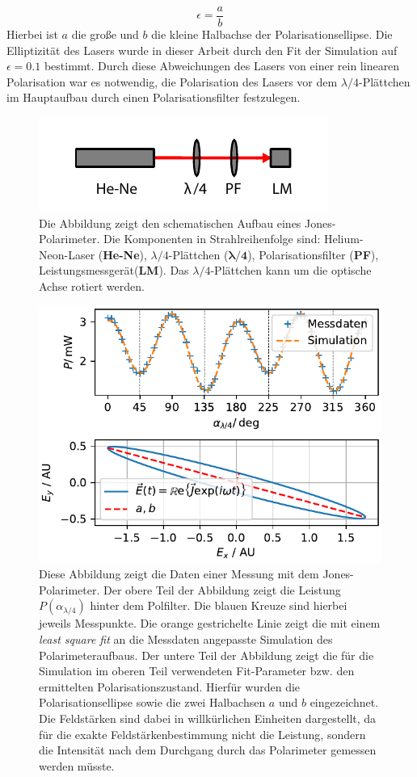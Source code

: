 \documentclass[titlepage,  ngerman]{article}
\begin{document}
	\begin{equation}
		\epsilon = \dfrac{a}{b}
	\end{equation}
	Hierbei ist $a$ die große und $b$ die kleine Halbachse der Polarisationsellipse. Die Elliptizität des Lasers wurde in dieser Arbeit durch den Fit der Simulation auf $\epsilon = 0.1 $ bestimmt. Durch diese Abweichungen des Lasers von einer rein linearen Polarisation war es notwendig, die Polarisation des Lasers vor dem $\lambda /4$-Plättchen im Hauptaufbau durch einen Polarisationsfilter festzulegen.
	\begin{figure}[h]
		\centering
		\includegraphics[width=0.5\linewidth]{figures/Polarimeter}
		\caption[Jones-Polarimeter]{Die Abbildung zeigt den schematischen Aufbau eines Jones-Polarimeter. Die Komponenten in Strahlreihenfolge sind: Helium-Neon-Laser (\textbf{He-Ne}), $\lambda/4$-Plättchen ($\boldsymbol{\lambda / 4}$), Polarisationsfilter (\textbf{PF}), Leistungsmessgerät(\textbf{LM}). Das $\lambda/4$-Plättchen kann um die optische Achse rotiert werden.}
		\label{fig:polarimeter}
	\end{figure}
	\begin{figure}[h]
		\centering
		\includegraphics[width=0.6\linewidth]{figures/new/3_2_graph_polarimeter}
		\caption[Polarimeter Simulation]{Diese Abbildung zeigt die Daten einer Messung mit dem Jones-Polarimeter. Der obere Teil der Abbildung zeigt die Leistung $P(\alpha_{\lambda /4})$ hinter dem Polfilter. Die blauen Kreuze sind hierbei jeweils Messpunkte. Die orange gestrichelte Linie zeigt die mit einem \textit{least square fit} an die Messdaten angepasste Simulation des Polarimeteraufbaus. Der untere Teil der Abbildung zeigt die für die Simulation im oberen Teil verwendeten Fit-Parameter bzw. den ermittelten Polarisationszustand. Hierfür wurden die Polarisationsellipse sowie die zwei Halbachsen $a$ und $b$ eingezeichnet. Die Feldstärken sind dabei in willkürlichen Einheiten dargestellt, da für die exakte Feldstärkenbestimmung nicht die Leistung, sondern die Intensität nach dem Durchgang durch das Polarimeter gemessen werden müsste.}
		\label{fig:graphpolarimeter}
	\end{figure}
\end{document}
